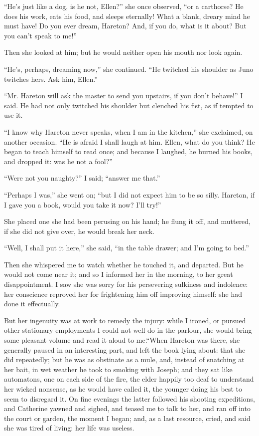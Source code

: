 \par “He's just like a dog, is he not, Ellen?” she once observed, “or a carthorse? He does his work, eats his food, and sleeps eternally! What a blank, dreary mind he must have! Do you ever dream, Hareton? And, if you do, what is it about? But you can't speak to me!”
\par Then she looked at him; but he would neither open his mouth nor look again.
\par “He's, perhaps, dreaming now,” she continued. “He twitched his shoulder as Juno twitches hers. Ask him, Ellen.”
\par “Mr. Hareton will ask the master to send you upstairs, if you don't behave!” I said. He had not only twitched his shoulder but clenched his fist, as if tempted to use it.
\par “I know why Hareton never speaks, when I am in the kitchen,” she exclaimed, on another occasion. “He is afraid I shall laugh at him. Ellen, what do you think? He began to teach himself to read once; and because I laughed, he burned his books, and dropped it: was he not a fool?”
\par “Were not you naughty?” I said; “answer me that.”
\par “Perhaps I was,” she went on; “but I did not expect him to be so silly. Hareton, if I gave you a book, would you take it now? I'll try!”
\par She placed one she had been perusing on his hand; he flung it off, and muttered, if she did not give over, he would break her neck.
\par “Well, I shall put it here,” she said, “in the table drawer; and I'm going to bed.”
\par Then she whispered me to watch whether he touched it, and departed. But he would not come near it; and so I informed her in the morning, to her great disappointment. I saw she was sorry for his persevering sulkiness and indolence: her conscience reproved her for frightening him off improving himself: she had done it effectually.
\par But her ingenuity was at work to remedy the injury: while I ironed, or pursued other stationary employments I could not well do in the parlour, she would bring some pleasant volume and read it aloud to me.“When Hareton was there, she generally paused in an interesting part, and left the book lying about: that she did repeatedly; but he was as obstinate as a mule, and, instead of snatching at her bait, in wet weather he took to smoking with Joseph; and they sat like automatons, one on each side of the fire, the elder happily too deaf to understand her wicked nonsense, as he would have called it, the younger doing his best to seem to disregard it. On fine evenings the latter followed his shooting expeditions, and Catherine yawned and sighed, and teased me to talk to her, and ran off into the court or garden, the moment I began; and, as a last resource, cried, and said she was tired of living: her life was useless.
